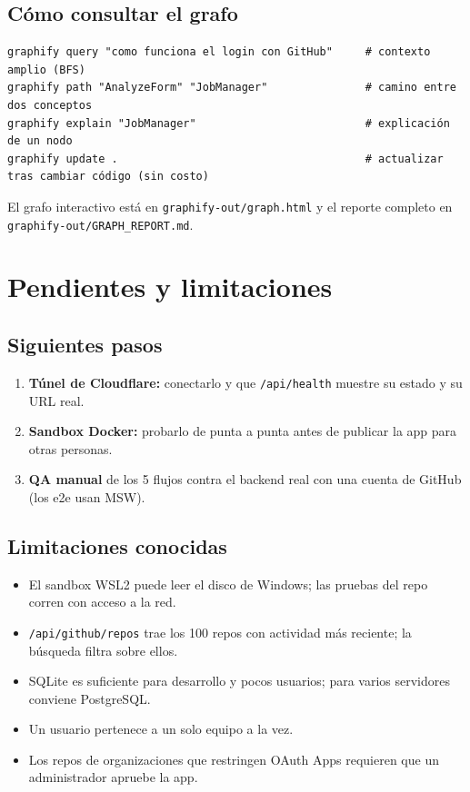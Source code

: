 \documentclass[11pt,a4paper]{article}
\newcommand{\code}[1]{\texttt{\small #1}}
\newcommand{\ruta}[1]{\texttt{\small\color{branddark}#1}}
\begin{document}
\subsection{Cómo consultar el grafo}

\begin{lstlisting}[language=texto]
graphify query "como funciona el login con GitHub"     # contexto amplio (BFS)
graphify path "AnalyzeForm" "JobManager"               # camino entre dos conceptos
graphify explain "JobManager"                          # explicación de un nodo
graphify update .                                      # actualizar tras cambiar código (sin costo)
\end{lstlisting}

El grafo interactivo está en \ruta{graphify-out/graph.html} y el reporte completo en \ruta{graphify-out/GRAPH\_REPORT.md}.

\section{Pendientes y limitaciones}

\subsection{Siguientes pasos}
\begin{enumerate}
  \item \textbf{Túnel de Cloudflare:} conectarlo y que \code{/api/health} muestre su estado y su URL real.
  \item \textbf{Sandbox Docker:} probarlo de punta a punta antes de publicar la app para otras personas.
  \item \textbf{QA manual} de los 5 flujos contra el backend real con una cuenta de GitHub (los e2e usan MSW).
\end{enumerate}

\subsection{Limitaciones conocidas}
\begin{itemize}
  \item El sandbox WSL2 puede leer el disco de Windows; las pruebas del repo corren con acceso a la red.
  \item \code{/api/github/repos} trae los 100 repos con actividad más reciente; la búsqueda filtra sobre ellos.
  \item SQLite es suficiente para desarrollo y pocos usuarios; para varios servidores conviene PostgreSQL.
  \item Un usuario pertenece a un solo equipo a la vez.
  \item Los repos de organizaciones que restringen OAuth Apps requieren que un administrador apruebe la app.
\end{itemize}
\end{document}
